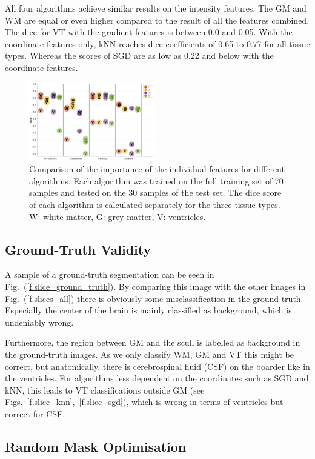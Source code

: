 \documentclass[journal]{IEEEtran}
\begin{document}
All four algorithms achieve similar results on the intensity features. The GM and WM are equal or even higher compared to the result of all the features combined. The dice for VT with the gradient features is between 0.0 and 0.05. With the coordinate features only, kNN reaches dice coefficients of 0.65 to 0.77 for all tissue types. Whereas the scores of SGD are as low as 0.22 and below with the coordinate features.
\begin{figure}[h]
	\centering
	\includegraphics[width=0.49\textwidth]{images/FeatureEvaluation}
	\caption{Comparison of the importance of the individual features for different algorithms. Each algorithm was trained on the full training set of 70 samples and tested on the 30 samples of the test set. The dice score of each algorithm is calculated separately for the three tissue types. W: white matter, G: grey matter, V: ventricles.}
	\label{FeatEval} 
\end{figure}

\subsection{Ground-Truth Validity}

A sample of a ground-truth segmentation can be seen in Fig.~(\ref{f.slice_ground_truth}). By comparing this image with the other images in Fig.~(\ref{f.slices_all}) there is obviously some misclassification in the ground-truth. Especially the center of the brain is mainly classified as background, which is undeniably wrong. 

Furthermore, the region between GM and the scull is labelled as background in the ground-truth images. As we only classify WM, GM and VT this might be correct, but anatomically, there is cerebrospinal fluid (CSF) on the boarder like in the ventricles. For algorithms less dependent on the coordinates such as SGD and kNN, this leads to VT classifications outside GM (see Figs.~\ref{f.slice_knn},~\ref{f.slice_sgd}), which is wrong in terms of ventricles but correct for CSF.


\subsection{Random Mask Optimisation}
\end{document}
